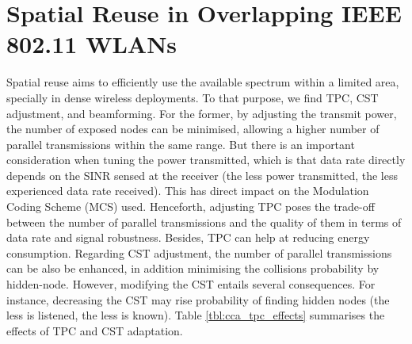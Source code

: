 \documentclass[12pt, a4paper,twoside]{tesi_upf}
\begin{document}
		\section{Spatial Reuse in Overlapping IEEE 802.11 WLANs}
		\label{section:spatial_reuse}	
			Spatial reuse aims to efficiently use the available spectrum within a limited area, specially in dense wireless deployments. To that purpose, we find TPC, CST adjustment, and beamforming. For the former, by adjusting the transmit power, the number of exposed nodes can be minimised, allowing a higher number of parallel transmissions within the same range. But there is an important consideration when tuning the power transmitted, which is that data rate directly depends on the SINR sensed at the receiver (the less power transmitted, the less experienced data rate received). This has direct impact on the Modulation Coding Scheme (MCS) used. Henceforth, adjusting TPC poses the trade-off between the number of parallel transmissions and the quality of them in terms of data rate and signal robustness. Besides, TPC can help at reducing energy consumption. Regarding CST adjustment, the number of parallel transmissions can be also be enhanced, in addition minimising the collisions probability by hidden-node. However, modifying the CST entails several consequences. For instance, decreasing the CST may rise probability of finding hidden nodes (the less is listened, the less is known). Table \ref{tbl:cca_tpc_effects} summarises the effects of TPC and CST adaptation.			
\end{document}
